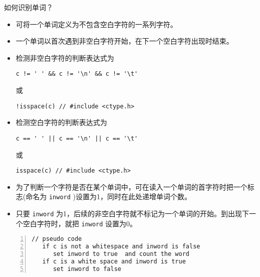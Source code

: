 \begin{frame}[fragile]\ft{\secname}
如何识别单词？ \pause \vspace{.1in}
\begin{itemize}
\item 可将一个单词定义为不包含空白字符的一系列字符。\\[0.15in]
\item 一个单词以首次遇到非空白字符开始，在下一个空白字符出现时结束。
\end{itemize}
\end{frame}

\begin{frame}[fragile]\ft{\secname}
\begin{itemize}
\item 检测非空白字符的判断表达式为
\begin{lstlisting}
c != ' ' && c != '\n' && c != '\t'
\end{lstlisting} 
或
\begin{lstlisting}
!isspace(c) // #include <ctype.h>
\end{lstlisting}\vspace{0.1in}

\item 检测空白字符的判断表达式为
\begin{lstlisting}
c == ' ' || c == '\n' || c == '\t'
\end{lstlisting}
或
\begin{lstlisting}
isspace(c) // #include <ctype.h>
\end{lstlisting}
\end{itemize}
\end{frame}

\begin{frame}[fragile]\ft{\secname}
\begin{itemize}
\item
为了判断一个字符是否在某个单词中，可在读入一个单词的首字符时把一个标志(命名为 \lstinline|inword| )设置为1，同时在此处递增单词个数。\\[.15in]
\item
只要 \lstinline|inword| 为1，后续的非空白字符就不标记为一个单词的开始。到出现下一个空白字符时，就把 \lstinline|inword| 设置为0。
\end{itemize}
\begin{lstlisting}[numbers=left]
// pseudo code
   if c is not a whitespace and inword is false
      set inword to true  and count the word
   if c is a white space and inword is true
      set inword to false   
\end{lstlisting}

\end{frame}

